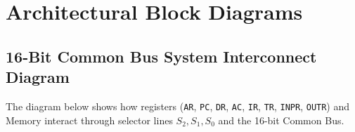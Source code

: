 \documentclass[11pt,a4paper]{article}
\begin{document}
\newpage

\section{\textcolor{primaryblue}{Architectural Block Diagrams}}

\subsection{16-Bit Common Bus System Interconnect Diagram}
The diagram below shows how registers (\texttt{AR}, \texttt{PC}, \texttt{DR}, \texttt{AC}, \texttt{IR}, \texttt{TR}, \texttt{INPR}, \texttt{OUTR}) and Memory interact through selector lines $S_2, S_1, S_0$ and the 16-bit Common Bus.

\vspace{0.4cm}
\end{document}
